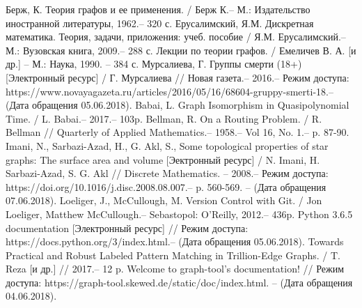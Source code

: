 

\begin{thebibliography}{}
	  Берж, К. Теория графов и ее применения. / Берж К.-- М.: Издательство иностранной литературы, 1962.-- 320 с.
	  Ерусалимский, Я.М. Дискретная математика. Теория, задачи, приложения: учеб. пособие / Я.М. Ерусалимский.-- М.: Вузовская книга, 2009.-- 288 с.
	 Лекции по теории графов. / Емеличев В. А. [и др.] -- М.: Наука, 1990. -- 384 с.	
	  Мурсалиева, Г. Группы смерти (18+) [Электронный ресурс] / Г. Мурсалиева // Новая газета.-- 2016.-- Режим доступа: https://www.novayagazeta.ru/articles/2016/05/16/68604-gruppy-smerti-18.-- (Дата обращения 05.06.2018).
	 Babai, L. Graph Isomorphism in Quasipolynomial Time. / L. Babai.-- 2017.-- 103p.
	 Bellman, R. On a Routing Problem. / R. Bellman // Quarterly of Applied Mathematics.-- 1958.-- Vol 16, No. 1.-- p. 87-90.
	  Imani, N., Sarbazi-Azad, H., G. Akl, S., Some topological properties of star graphs: The surface area and volume [Эектронный ресурс] / N. Imani, H. Sarbazi-Azad, S. G. Akl // Discrete Mathematics. -- 2008.-- Режим доступа: https://doi.org/10.1016/j.disc.2008.08.007.-- p. 560-569. -- (Дата обращения 07.06.2018).
	 Loeliger, J., McCullough, M. Version Control with Git. / Jon Loeliger, Matthew McCullough.-- Sebastopol: O'Reilly, 2012.-- 436p.
	 Python 3.6.5 documentation [Электронный ресурс] // Режим доступа: https://docs.python.org/3/index.html.-- (Дата обращения 05.06.2018).
	  Towards Practical and Robust Labeled Pattern Matching in Trillion-Edge Graphs. / T. Reza [и др.] // 2017.-- 12 p.
	 Welcome to graph-tool’s documentation! // Режим доступа: https://graph-tool.skewed.de/static/doc/index.html. -- (Дата обращения 04.06.2018).
\end{thebibliography}
